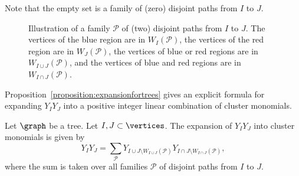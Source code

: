 Note that the empty set is a family of (zero) disjoint paths from \(I\) to \(J\).

\begin{figure}[htbp]
    \centering
    \caption{Illustration of a family \(\mathcal{P}\) of (two) disjoint paths from \(I\) to \(J\).
    The vertices of the blue region are in \(W_I(\mathcal{P})\),
    the vertices of the red region are in \(W_J(\mathcal{P})\),
    the vertices of blue or red regions are in \(W_{I \cup J}(\mathcal{P})\),
    and the vertices of blue and red regions are in \(W_{I \cap J}(\mathcal{P})\).}
    \label{fig:disjointpaths}
\end{figure}

Proposition~\ref{proposition:expansionfortrees} gives an explicit formula for expanding \(Y_IY_J\) into a positive integer linear combination of cluster monomials.

\begin{prop} \label{proposition:expansionfortrees}
    Let \(\graph\) be a tree.
    Let \(I, J \subset \vertices\).
    The expansion of \(Y_IY_J\) into cluster monomials is given by
    \begin{equation*}
        Y_IY_J = \sum_{\mathcal{P}} Y_{I \cup J \setminus W_{I \cup J}(\mathcal{P})}Y_{I \cap J \setminus W_{I \cap J}(\mathcal{P})},
    \end{equation*} 
    where the sum is taken over all families \(\mathcal{P}\) of disjoint paths from \(I\) to \(J\).
\end{prop}

